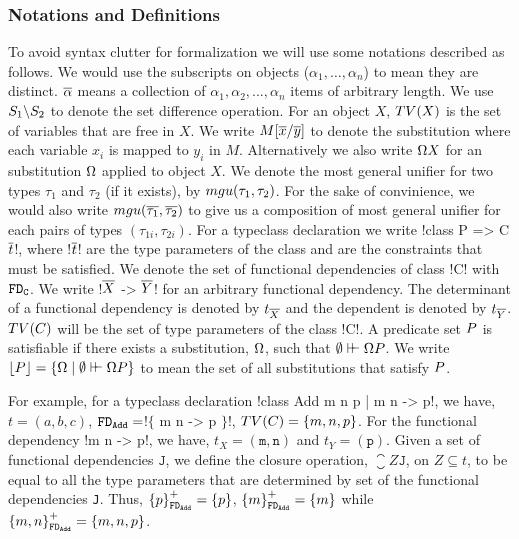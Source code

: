 \documentclass[format=sigplan,manuscript,review,screen,nonacm,margin=1in]{acmart}
\begin{document}
\subsubsection {Notations and Definitions}\label{subsubsec:fd-notations}
To avoid syntax clutter for formalization we will use some notations described as follows.
We would use the subscripts on objects ($\alpha_1,\ldots, \alpha_n$) to mean they are distinct.
$\overline{\alpha}$ means a collection of $\alpha_1, \alpha_2, ..., \alpha_n$ items of arbitrary length.
We use $S_1 \backslash S_2$ to denote the set difference operation. For an object $X$,
$TV(X)$ is the set of variables that are free in $X$.
We write $M[\overline{x}/\overline{y}]$ to denote the substitution where each variable
$x_i$ is mapped to $y_i$ in $M$. Alternatively we also
write $\Omega X$ for an substitution $\Omega$ applied to object $X$.
We denote the most general unifier for two types $\tau_1$ and $\tau_2$ (if it exists),
by $mgu(\tau_1,\tau_2)$\cite{robinson_machine-oriented_1965}. For the sake of convinience,
we would also write $mgu(\overline{\tau_1},\overline{\tau_2})$ to give us a composition of most general
unifier for each pairs of types $(\tau_{1i}, \tau_{2i})$.
For a typeclass declaration we write !class P => C $\overline{t}$!, where !$\overline{t}$! are the type parameters
of the class and \Preds{} are the constraints that must be satisfied.
We denote the set of functional dependencies of class !C! with $\texttt{FD}_\texttt{C}$.
We write !$\overline{X}$ -> $\overline{Y}$! for an arbitrary functional dependency.
The determinant of a functional dependency is denoted by $t_{\overline{X}}$
and the dependent is denoted by  $t_{\overline{Y}}$. $TV(C)$ will be the set of type parameters
of the class !C!. A predicate set $P$ is satisfiable if there exists a substitution,
$\Omega$, such that $\emptyset\vdash\hspace{-0.7ex}\vdash \Omega P$.
We write $\lfloor P\rfloor = \{\Omega \mid \emptyset \vdash\hspace{-0.7ex}\vdash \Omega P\}$
to mean the set of all substitutions that satisfy $P$.

For example, for a typeclass declaration !class Add m n p | m n -> p!,
we have, $t = (a, b, c)$, $\texttt{FD}_\texttt{Add}=$!$\{$ m n -> p $\}$!, $TV(C) = \{m, n, p\}$.
For the functional dependency !m n -> p!, we have, $t_X = {(\texttt{m},\texttt{n})}$ and $t_Y = {(\texttt{p})}$.
Given a set of functional dependencies $\texttt{J}$, we define the closure operation,
$\closure Z {\texttt{J}}$, on $Z \subseteq t$, to be equal to all the type parameters
that are determined by set of the functional dependencies \texttt{J}.
Thus, ${\{p\}}^{+}_{\texttt{FD}_\texttt{Add}} = \{p\}$,
${\{m\}}^{+}_{\texttt{FD}_\texttt{Add}} = \{m\}$ while ${\{m, n\}}^{+}_{\texttt{FD}_\texttt{Add}} = \{m, n, p\}$.
\end{document}
